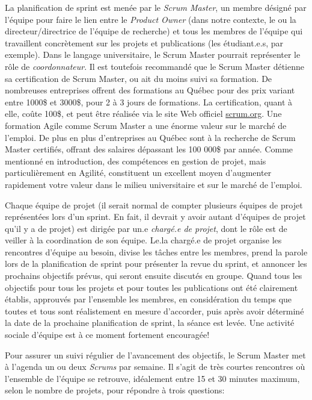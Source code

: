 \documentclass[
  letterpaper,
  DIV=11,
  numbers=noendperiod]{scrreprt}
\begin{document}
La planification de sprint est menée par le \emph{Scrum Master}, un
membre désigné par l'équipe pour faire le lien entre le \emph{Product
Owner} (dans notre contexte, le ou la directeur/directrice de l'équipe
de recherche) et tous les membres de l'équipe qui travaillent
concrètement sur les projets et publications (les étudiant.e.s, par
exemple). Dans le langage universitaire, le Scrum Master pourrait
représenter le rôle de \emph{coordonnateur}. Il est toutefois recommandé
que le Scrum Master détienne sa certification de Scrum Master, ou ait du
moins suivi sa formation. De nombreuses entreprises offrent des
formations au Québec pour des prix variant entre 1000\$ et 3000\$, pour
2 à 3 jours de formations. La certification, quant à elle, coûte 100\$,
et peut être réalisée via le site Web officiel
\href{https://www.scrum.org/professional-scrum-certifications/professional-scrum-master-assessments}{scrum.org}.
Une formation Agile comme Scrum Master a une énorme valeur sur le marché
de l'emploi. De plus en plus d'entreprises au Québec sont à la recherche
de Scrum Master certifiés, offrant des salaires dépassant les 100 000\$
par année. Comme mentionné en introduction, des compétences en gestion
de projet, mais particulièrement en Agilité, constituent un excellent
moyen d'augmenter rapidement votre valeur dans le milieu universitaire
et sur le marché de l'emploi.

Chaque équipe de projet (il serait normal de compter plusieurs équipes
de projet représentées lors d'un sprint. En fait, il devrait y avoir
autant d'équipes de projet qu'il y a de projet) est dirigée par un.e
\emph{chargé.e de projet}, dont le rôle est de veiller à la coordination
de son équipe. Le.la chargé.e de projet organise les rencontres d'équipe
au besoin, divise les tâches entre les membres, prend la parole lors de
la planification de sprint pour présenter la revue du sprint, et
annoncer les prochains objectifs prévus, qui seront ensuite discutés en
groupe. Quand tous les objectifs pour tous les projets et pour toutes
les publications ont été clairement établis, approuvés par l'ensemble
les membres, en considération du temps que toutes et tous sont
réalistement en mesure d'accorder, puis après avoir déterminé la date de
la prochaine planification de sprint, la séance est levée. Une activité
sociale d'équipe est à ce moment fortement encouragée!

Pour assurer un suivi régulier de l'avancement des objectifs, le Scrum
Master met à l'agenda un ou deux \emph{Scrums} par semaine. Il s'agit de
très courtes rencontres où l'ensemble de l'équipe se retrouve,
idéalement entre 15 et 30 minutes maximum, selon le nombre de projets,
pour répondre à trois questions:
\end{document}
